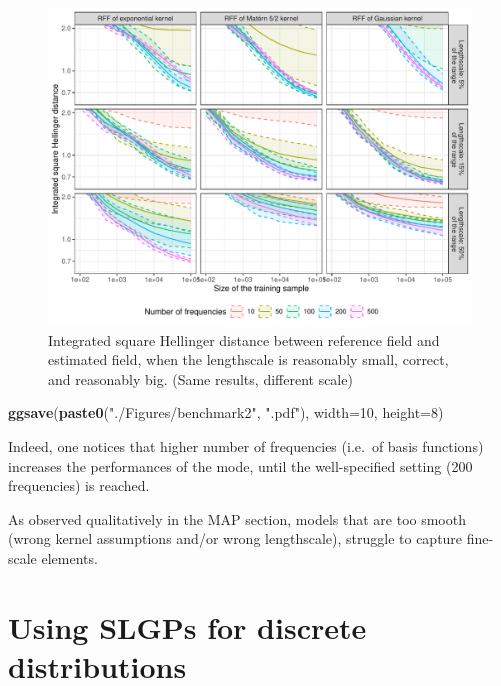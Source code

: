 \documentclass[
]{article}
\newenvironment{Shaded}{\begin{snugshade}}{\end{snugshade}}
\newcommand{\AttributeTok}[1]{\textcolor[rgb]{0.13,0.29,0.53}{#1}}
\newcommand{\DecValTok}[1]{\textcolor[rgb]{0.00,0.00,0.81}{#1}}
\newcommand{\FunctionTok}[1]{\textcolor[rgb]{0.13,0.29,0.53}{\textbf{#1}}}
\newcommand{\NormalTok}[1]{#1}
\newcommand{\StringTok}[1]{\textcolor[rgb]{0.31,0.60,0.02}{#1}}
\begin{document}
\begin{figure}[H]

{\centering \includegraphics{IntroductionSLGP_files/figure-latex/PlotOtherLen2-1} 

}

\caption{Integrated square Hellinger distance between reference field and estimated field, when the lengthscale is reasonably small, correct, and reasonably big. (Same results, different scale)}\label{fig:PlotOtherLen2}
\end{figure}

\begin{Shaded}
\begin{Highlighting}[]
\FunctionTok{ggsave}\NormalTok{(}\FunctionTok{paste0}\NormalTok{(}\StringTok{"./Figures/benchmark2"}\NormalTok{,  }\StringTok{".pdf"}\NormalTok{), }\AttributeTok{width=}\DecValTok{10}\NormalTok{, }\AttributeTok{height=}\DecValTok{8}\NormalTok{)}
\end{Highlighting}
\end{Shaded}

Indeed, one notices that higher number of frequencies (i.e.~of basis functions) increases the performances of the mode, until the well-specified setting (200 frequencies) is reached.

As observed qualitatively in the MAP section, models that are too smooth (wrong kernel assumptions and/or wrong lengthscale), struggle to capture fine-scale elements.

\section{Using SLGPs for discrete distributions}\label{using-slgps-for-discrete-distributions}
\end{document}
